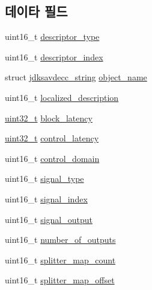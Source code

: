 \subsection*{데이타 필드}
\begin{DoxyCompactItemize}
\item 
uint16\+\_\+t \hyperlink{structjdksavdecc__descriptor__signal__splitter_ab7c32b6c7131c13d4ea3b7ee2f09b78d}{descriptor\+\_\+type}
\item 
uint16\+\_\+t \hyperlink{structjdksavdecc__descriptor__signal__splitter_a042bbc76d835b82d27c1932431ee38d4}{descriptor\+\_\+index}
\item 
struct \hyperlink{structjdksavdecc__string}{jdksavdecc\+\_\+string} \hyperlink{structjdksavdecc__descriptor__signal__splitter_a7d1f5945a13863b1762fc6db74fa8f80}{object\+\_\+name}
\item 
uint16\+\_\+t \hyperlink{structjdksavdecc__descriptor__signal__splitter_a0926f846ca65a83ad5bb06b4aff8f408}{localized\+\_\+description}
\item 
\hyperlink{parse_8c_a6eb1e68cc391dd753bc8ce896dbb8315}{uint32\+\_\+t} \hyperlink{structjdksavdecc__descriptor__signal__splitter_ae2e9f0088d5e900b610d1b2818dfc559}{block\+\_\+latency}
\item 
\hyperlink{parse_8c_a6eb1e68cc391dd753bc8ce896dbb8315}{uint32\+\_\+t} \hyperlink{structjdksavdecc__descriptor__signal__splitter_ab2bd4639caaf9a8078b68368afbd63b6}{control\+\_\+latency}
\item 
uint16\+\_\+t \hyperlink{structjdksavdecc__descriptor__signal__splitter_a8937b22996b7c28ae209f29fe777f03a}{control\+\_\+domain}
\item 
uint16\+\_\+t \hyperlink{structjdksavdecc__descriptor__signal__splitter_a248e60ef99d5ed1779989d1dd6b6dc5a}{signal\+\_\+type}
\item 
uint16\+\_\+t \hyperlink{structjdksavdecc__descriptor__signal__splitter_ae2e81a95ee9ad83f1fe22b6a1ee29075}{signal\+\_\+index}
\item 
uint16\+\_\+t \hyperlink{structjdksavdecc__descriptor__signal__splitter_ab4b91864e6fc335d7e86536d9f4461e4}{signal\+\_\+output}
\item 
uint16\+\_\+t \hyperlink{structjdksavdecc__descriptor__signal__splitter_acce19609ff3454a0c9b0213591331fa7}{number\+\_\+of\+\_\+outputs}
\item 
uint16\+\_\+t \hyperlink{structjdksavdecc__descriptor__signal__splitter_aebf6a6b0659a75f9a4eea6629f987cac}{splitter\+\_\+map\+\_\+count}
\item 
uint16\+\_\+t \hyperlink{structjdksavdecc__descriptor__signal__splitter_aed40a18f33bb308d5d9c862701af62fe}{splitter\+\_\+map\+\_\+offset}
\end{DoxyCompactItemize}


